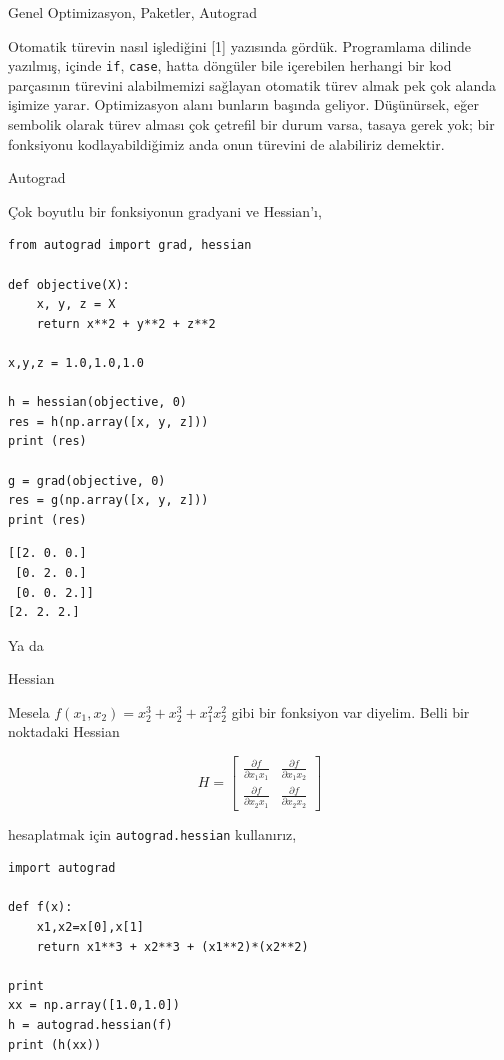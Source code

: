 \documentclass[12pt,fleqn]{article}\usepackage{../../common}
\begin{document}
Genel Optimizasyon, Paketler, Autograd

Otomatik türevin nasıl işlediğini [1] yazısında gördük. Programlama dilinde
yazılmış, içinde \verb!if!, \verb!case!, hatta döngüler bile içerebilen
herhangi bir kod parçasının türevini alabilmemizi sağlayan otomatik türev
almak pek çok alanda işimize yarar. Optimizasyon alanı bunların başında
geliyor. Düşünürsek, eğer sembolik olarak türev alması çok çetrefil bir
durum varsa, tasaya gerek yok; bir fonksiyonu kodlayabildiğimiz anda onun
türevini de alabiliriz demektir.

Autograd

Çok boyutlu bir fonksiyonun gradyani ve Hessian'ı,

\begin{verbatim}
from autograd import grad, hessian

def objective(X): 
    x, y, z = X
    return x**2 + y**2 + z**2

x,y,z = 1.0,1.0,1.0

h = hessian(objective, 0)
res = h(np.array([x, y, z]))
print (res)

g = grad(objective, 0)
res = g(np.array([x, y, z]))
print (res)
\end{verbatim}

\begin{verbatim}
[[2. 0. 0.]
 [0. 2. 0.]
 [0. 0. 2.]]
[2. 2. 2.]
\end{verbatim}

Ya da

Hessian

Mesela $f(x_1,x_2) = x_2^3 + x_2^3 + x_1^2x_2^2$ gibi bir fonksiyon var
diyelim. Belli bir noktadaki Hessian

$$
H = \left[\begin{array}{rr}
\frac{\partial f}{\partial x_1x_1} & \frac{\partial f}{\partial x_1x_2} \\
\frac{\partial f}{\partial x_2x_1} & \frac{\partial f}{\partial x_2x_2} 
\end{array}\right]
$$

hesaplatmak için \verb!autograd.hessian! kullanırız,

\begin{verbatim}
import autograd 

def f(x):
    x1,x2=x[0],x[1]
    return x1**3 + x2**3 + (x1**2)*(x2**2)

print
xx = np.array([1.0,1.0])
h = autograd.hessian(f)
print (h(xx))
\end{verbatim}
\end{document}
